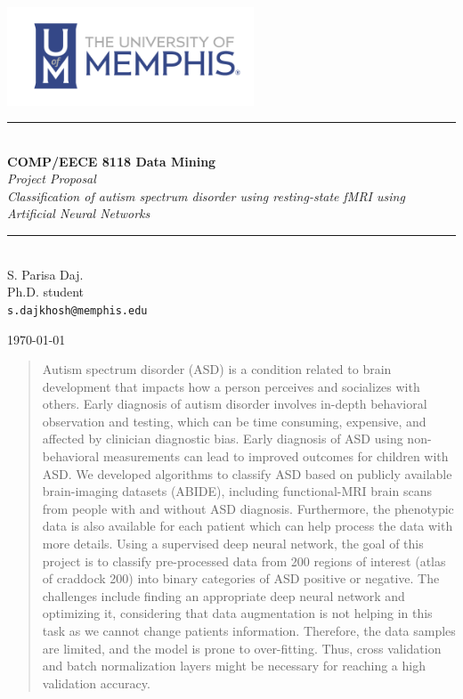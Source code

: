 \documentclass[12pt,a4paper]{article}
\newcommand{\HRule}{\rule{\linewidth}{0.5mm}}
\begin{document}
	
	\begin{titlepage}
		\begin{center}
			
			\includegraphics[width=0.55\textwidth]{figs/cslogo_horizontal.png}~\\[2cm]
			
			
			\HRule \\[0.4cm]
			{ \LARGE 
				\textbf{COMP/EECE 8118 Data Mining}\\[0.4cm]
				\emph{Project Proposal}\\[0.4cm]
				\emph{Classification of autism spectrum disorder using resting-state fMRI using Artificial Neural Networks}\\[0.4cm]
			}
			\HRule \\[1.5cm]
			
			
			
			{ \large
				S. Parisa Daj. \\[0.1cm]
				Ph.D. student\\[0.1cm]
				\texttt{s.dajkhosh@memphis.edu}
			}
			
			\vfill
			
			
			{\large \today}
			
		\end{center}
	\end{titlepage}

	
\begin{abstract}
	
	Autism spectrum disorder (ASD) is a condition related to brain development that impacts how a person perceives and socializes with others. Early diagnosis of autism disorder involves in-depth behavioral observation and testing, which can be time consuming, expensive, and affected by clinician diagnostic bias. Early diagnosis of ASD using non-behavioral measurements can lead to improved outcomes for children with ASD. We developed algorithms to classify ASD based on publicly available brain-imaging datasets (ABIDE)\cite{abidei}, including functional-MRI brain scans from people with and without ASD diagnosis. Furthermore, the phenotypic data is also available for each patient which can help process the data with more details. Using a supervised deep neural network, the goal of this project is to classify pre-processed data from 200 regions of interest (atlas of craddock 200) into binary categories of ASD positive or negative. The challenges include finding an appropriate deep neural network and optimizing it, considering that data augmentation is not helping in this task as we cannot change patients information. Therefore, the data samples are limited, and the model is prone to over-fitting. Thus, cross validation and batch normalization layers might be necessary for reaching a high validation accuracy.
	
\end{abstract}

 


\vspace{12pt}
\end{document}
